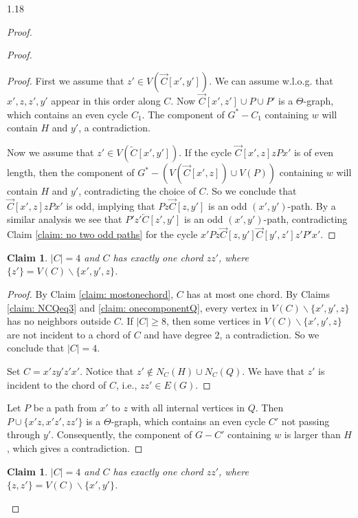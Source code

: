 \documentclass[10pt]{article}
\newtheorem{claim}{Claim}
\newtheorem{subclaim}{Claim}[claim]
\begin{document}
\begin{spacing}{1.18}
\begin{proof}
\begin{proof}
\begin{proof}
        First we assume that $z'\in V(\overrightarrow{C}[x',y'])$. We can assume w.l.o.g. that $x',z,z',y'$ appear in this order along $C$. Now $\overrightarrow{C}[x',z']\cup P\cup P'$ is a $\varTheta$-graph, which contains an even cycle $C_1$. The component of $G^*-C_1$ containing $w$ will contain $H$ and $y'$, a contradiction.

        Now we assume that $z'\in V(\overleftarrow{C}[x',y'])$. If the cycle $\overrightarrow{C}[x',z]zPx'$ is of even length, then the component of $G^*-(V(\overrightarrow{C}[x',z])\cup V(P))$ containing $w$ will contain $H$ and $y'$, contradicting the choice of $C$. So we conclude that $\overrightarrow{C}[x',z]zPx'$ is odd, implying that $Pz\overrightarrow{C}[z,y']$ is an odd $(x',y')$-path. By a similar analysis we see that $P'z'\overleftarrow{C}[z',y']$ is an odd $(x',y')$-path, contradicting Claim \ref{claim: no two odd paths} for the cycle $x'Pz\overrightarrow{C}[z,y']\overrightarrow{C}[y',z']z'P'x'$.
    \end{proof}

    \begin{subclaim}\label{claim: Ceq4}
        $|C|=4$ and $C$ has exactly one chord $zz'$, where $\{z'\}=V(C)\backslash\{x',y',z\}$.
    \end{subclaim}

    \begin{proof}
        By Claim \ref{claim: mostonechord}, $C$ has at most one chord. By Claims \ref{claim: NCQeq3} and \ref{claim: onecomponentQ}, every vertex in $V(C)\backslash\{x',y',z\}$ has no neighbors outside $C$. If $|C|\geqslant 8$, then some vertices in $V(C)\backslash\{x',y',z\}$ are not incident to a chord of $C$ and have degree 2, a contradiction. So we conclude that $|C|=4$.
        
        Set $C=x'zy'z'x'$. Notice that $z'\notin N_C(H)\cup N_C(Q)$. We have that $z'$ is incident to the chord of $C$, i.e., $zz'\in E(G)$.
    \end{proof}

    
    Let $P$ be a path from $x'$ to $z$ with all internal vertices in $Q$. Then $P\cup \{x'z,x'z',zz'\}$ is a $\varTheta$-graph, which contains an even cycle $C'$ not passing through $y'$. Consequently, the component of $G - C'$ containing $w$ is larger than $H$, which gives a contradiction.
\end{proof}

\begin{claim}\label{claim: Ceq4-noQ}
    $|C|=4$ and $C$ has exactly one chord $zz'$, where $\{z,z'\}=V(C)\backslash\{x',y'\}$.
\end{claim}


\end{proof}
\end{spacing}
\end{document}

